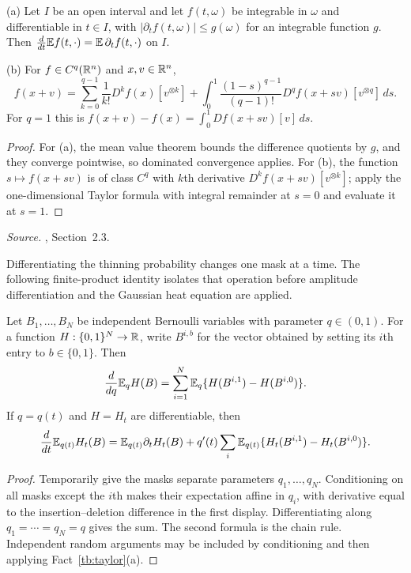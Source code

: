 \begin{fact}
\label{tb:taylor}
(a) Let \(I\) be an open interval and let \(f(t,\omega)\) be
integrable in \(\omega\) and differentiable in \(t\in I\), with
\(|\partial_t f(t,\omega)|\le g(\omega)\) for an integrable
function \(g\). Then \(\frac d{dt}\mathbb E f(t,\cdot)
=\mathbb E\,\partial_t f(t,\cdot)\) on \(I\).

(b) For \(f\in C^q(\mathbb R^n)\) and \(x,v\in\mathbb R^n\),
\[
 f(x+v)=\sum_{k=0}^{q-1}\frac1{k!}D^kf(x)[v^{\otimes k}]
 +\int_0^1\frac{(1-s)^{q-1}}{(q-1)!}D^qf(x+sv)[v^{\otimes q}]\,ds.
\]
For \(q=1\) this is \(f(x+v)-f(x)=\int_0^1Df(x+sv)[v]\,ds\).
\end{fact}

\begin{proof}
For (a), the mean value theorem bounds the difference quotients by \(g\),
and they converge pointwise, so dominated convergence applies. For (b),
the function \(s\mapsto f(x+sv)\) is of class \(C^q\) with \(k\)th derivative
\(D^kf(x+sv)[v^{\otimes k}]\); apply the one-dimensional Taylor formula with
integral remainder at \(s=0\) and evaluate it at \(s=1\).
\end{proof}

\emph{Source.} , Section~2.3.

Differentiating the thinning probability changes one mask at a time.
The following finite-product identity isolates that operation before
amplitude differentiation and the Gaussian heat equation are applied.

\begin{fact}\label{tb:bernoulli}
Let \(B_1,\ldots,B_N\) be independent Bernoulli variables with parameter
\(q\in(0,1)\). For a function \(H:\{0,1\}^N\to\mathbb R\), write
\(B^{i,b}\) for the vector obtained by setting its \(i\)th entry to
\(b\in\{0,1\}\). Then
\[
 \frac{d}{dq}\mathbb E_q H(B)
 =\sum_{i=1}^N\mathbb E_q\{H(B^{i,1})-H(B^{i,0})\}.
\]
If \(q=q(t)\) and \(H=H_t\) are differentiable, then
\[
 \frac{d}{dt}\mathbb E_{q(t)}H_t(B)
 =\mathbb E_{q(t)}\partial_t H_t(B)
 +q'(t)\sum_i\mathbb E_{q(t)}
       \{H_t(B^{i,1})-H_t(B^{i,0})\}.
\]
\end{fact}

\begin{proof}
Temporarily give the masks separate parameters \(q_1,\ldots,q_N\).
Conditioning on all masks except the \(i\)th makes their expectation
affine in \(q_i\), with derivative equal to the insertion--deletion
difference in the first display. Differentiating along
\(q_1=\cdots=q_N=q\) gives the sum. The second formula is the chain
rule. Independent random arguments may be included by conditioning
and then applying Fact~\ref{tb:taylor}(a).
\end{proof}

